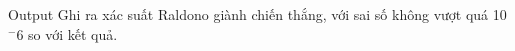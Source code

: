 Output
Ghi ra xác suất Raldono giành chiến thắng, với sai số không vượt quá 10 $^ -6 $ so với kết quả.